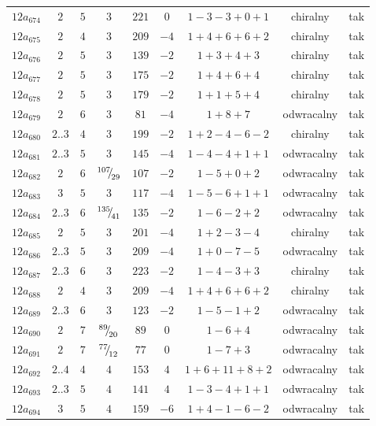 \begin{longtable}{ccccccccc}
$12a_{674}$ & $2$ & $5$ & $3$ & $221$ & $0$ & $1-3-3+0+1$ & chiralny & tak \\
$12a_{675}$ & $2$ & $4$ & $3$ & $209$ & $-4$ & $1+4+6+6+2$ & chiralny & tak \\
$12a_{676}$ & $2$ & $5$ & $3$ & $139$ & $-2$ & $1+3+4+3$ & chiralny & tak \\
$12a_{677}$ & $2$ & $5$ & $3$ & $175$ & $-2$ & $1+4+6+4$ & chiralny & tak \\
$12a_{678}$ & $2$ & $5$ & $3$ & $179$ & $-2$ & $1+1+5+4$ & chiralny & tak \\
$12a_{679}$ & $2$ & $6$ & $3$ & $81$ & $-4$ & $1+8+7$ & odwracalny & tak \\
$12a_{680}$ & $2..3$ & $4$ & $3$ & $199$ & $-2$ & $1+2-4-6-2$ & chiralny & tak \\
$12a_{681}$ & $2..3$ & $5$ & $3$ & $145$ & $-4$ & $1-4-4+1+1$ & odwracalny & tak \\
$12a_{682}$ & $2$ & $6$ & ${}^{107}{\mskip -5mu/\mskip -3mu}_{29}$ & $107$ & $-2$ & $1-5+0+2$ & odwracalny & tak \\
$12a_{683}$ & $3$ & $5$ & $3$ & $117$ & $-4$ & $1-5-6+1+1$ & odwracalny & tak \\
$12a_{684}$ & $2..3$ & $6$ & ${}^{135}{\mskip -5mu/\mskip -3mu}_{41}$ & $135$ & $-2$ & $1-6-2+2$ & odwracalny & tak \\
$12a_{685}$ & $2$ & $5$ & $3$ & $201$ & $-4$ & $1+2-3-4$ & chiralny & tak \\
$12a_{686}$ & $2..3$ & $5$ & $3$ & $209$ & $-4$ & $1+0-7-5$ & odwracalny & tak \\
$12a_{687}$ & $2..3$ & $6$ & $3$ & $223$ & $-2$ & $1-4-3+3$ & chiralny & tak \\
$12a_{688}$ & $2$ & $4$ & $3$ & $209$ & $-4$ & $1+4+6+6+2$ & chiralny & tak \\
$12a_{689}$ & $2..3$ & $6$ & $3$ & $123$ & $-2$ & $1-5-1+2$ & odwracalny & tak \\
$12a_{690}$ & $2$ & $7$ & ${}^{89}{\mskip -5mu/\mskip -3mu}_{20}$ & $89$ & $0$ & $1-6+4$ & odwracalny & tak \\
$12a_{691}$ & $2$ & $7$ & ${}^{77}{\mskip -5mu/\mskip -3mu}_{12}$ & $77$ & $0$ & $1-7+3$ & odwracalny & tak \\
$12a_{692}$ & $2..4$ & $4$ & $4$ & $153$ & $4$ & $1+6+11+8+2$ & odwracalny & tak \\
$12a_{693}$ & $2..3$ & $5$ & $4$ & $141$ & $4$ & $1-3-4+1+1$ & odwracalny & tak \\
$12a_{694}$ & $3$ & $5$ & $4$ & $159$ & $-6$ & $1+4-1-6-2$ & odwracalny & tak \\

\end{longtable}
